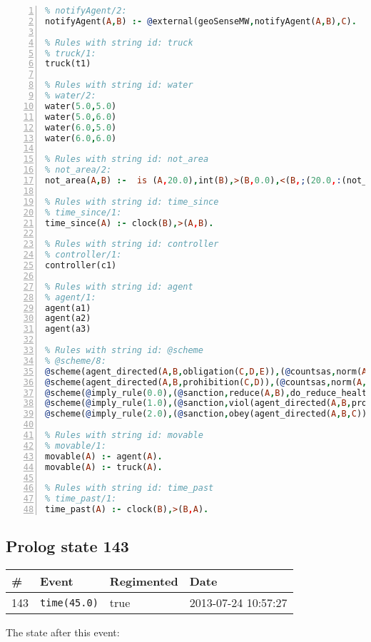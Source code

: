 \documentclass[11pt]{article}\usepackage[utf8]{inputenc}\usepackage{geometry}
\begin{document}
\begin{lstlisting}[language=Prolog, numbers=left]
% Rules with string id: notifyAgent
% notifyAgent/2:
notifyAgent(A,B) :- @external(geoSenseMW,notifyAgent(A,B),C).

% Rules with string id: truck
% truck/1:
truck(t1)

% Rules with string id: water
% water/2:
water(5.0,5.0)
water(5.0,6.0)
water(6.0,5.0)
water(6.0,6.0)

% Rules with string id: not_area
% not_area/2:
not_area(A,B) :-  is (A,20.0),int(B),>(B,0.0),<(B,;(20.0,:(not_area(A,B), is (-(B),20.0)))),int(A),>(A,0.0),<(A,;(20.0,:(area(A,B),-(int(A))))),int(B),>(A,0.0),>(B,0.0),<(A,21.0),<(B,21.0).

% Rules with string id: time_since
% time_since/1:
time_since(A) :- clock(B),>(A,B).

% Rules with string id: controller
% controller/1:
controller(c1)

% Rules with string id: agent
% agent/1:
agent(a1)
agent(a2)
agent(a3)

% Rules with string id: @scheme
% @scheme/8:
@scheme(agent_directed(A,B,obligation(C,D,E)),(@countsas,norm(A,B,F,obligation(C,D,E)),F),false,(listTrue(C)),(time_past(D)),false,[plus(viol(agent_directed(A,B,obligation(C,D,E))))|[]],[plus(obey(agent_directed(A,B,obligation(C,D,E))))|[]])
@scheme(agent_directed(A,B,prohibition(C,D)),(@countsas,norm(A,B,E,prohibition(C,D)),E),(listTrue(C)),false,(false),false,[plus(viol(agent_directed(A,B,prohibition(C,D))))|[]],[plus(obey(agent_directed(A,B,prohibition(C,D))))|[]])
@scheme(@imply_rule(0.0),(@sanction,reduce(A,B),do_reduce_health(A,B),notifyAgent(A,changed(status))),true,false,false,false,[min(reduce(A,B))|[]],[])
@scheme(@imply_rule(1.0),(@sanction,viol(agent_directed(A,B,prohibition(C,D))),do_sanction(D)),true,false,false,false,[min(viol(agent_directed(A,B,prohibition(C,D))))|[]],[])
@scheme(@imply_rule(2.0),(@sanction,obey(agent_directed(A,B,C))),true,false,false,false,[min(obey(agent_directed(A,B,C)))|[]],[])

% Rules with string id: movable
% movable/1:
movable(A) :- agent(A).
movable(A) :- truck(A).

% Rules with string id: time_past
% time_past/1:
time_past(A) :- clock(B),>(B,A).

\end{lstlisting}
\clearpage 
\subsection{Prolog state 143}
\begin{table}[ht]
\centering 
\begin{tabular}{l l l l} 
\textbf{\#} & \textbf{Event} & \textbf{Regimented} & \textbf{Date} \\ [0.5ex] 
\hline
143&\texttt{time(45.0)}&true&2013-07-24 10:57:27\\ [1ex] \hline\end{tabular}
\end{table}
The state after this event:
\end{document}
